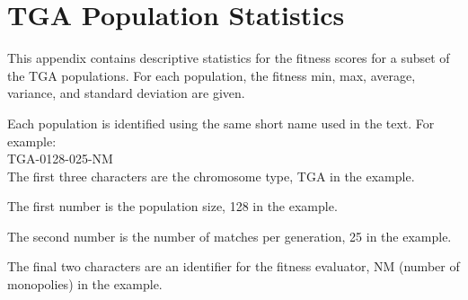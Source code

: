 \clearpage
\chapter{TGA Population Statistics}
\label{appendix:tgastats}

This appendix contains descriptive statistics for the fitness scores for a
subset of the TGA populations. For each population, the fitness min,
max, average, variance, and standard deviation are given.

Each population is identified using the same short name used in the text. For
example: \\ 

TGA-0128-025-NM \\ 

The first three characters are the chromosome type, TGA in the example.

The first number is the population size, 128 in the example.

The second number is the number of matches per generation, 25 in the example.

The final two characters are an identifier for the fitness evaluator, NM
(number of monopolies) in the example.

\newpage




